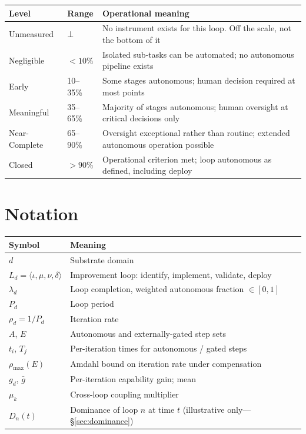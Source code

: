 \documentclass[11pt]{article}
\begin{document}
\begin{table}[h]
\centering
\footnotesize
\begin{tabular}{@{}llL{8.2cm}@{}}
\toprule
Level & Range & Operational meaning \\
\midrule
Unmeasured    & $\bot$     & No instrument exists for this loop. Off the scale, not the bottom of it \\
Negligible    & $<10\%$    & Isolated sub-tasks can be automated; no autonomous pipeline exists \\
Early         & 10--35\%   & Some stages autonomous; human decision required at most points \\
Meaningful    & 35--65\%   & Majority of stages autonomous; human oversight at critical decisions only \\
Near-Complete & 65--90\%   & Oversight exceptional rather than routine; extended autonomous operation possible \\
Closed        & $>90\%$    & Operational criterion met; loop autonomous as defined, including deploy \\
\bottomrule
\end{tabular}
\end{table}

\section{Notation}
\label{app:notation}

\begin{table}[h]
\centering
\footnotesize
\begin{tabular}{@{}lL{9.4cm}@{}}
\toprule
Symbol & Meaning \\
\midrule
$d$ & Substrate domain \\
$L_d = \langle\iota,\mu,\nu,\delta\rangle$ & Improvement loop: identify, implement, validate, deploy \\
$\lambda_d$ & Loop completion, weighted autonomous fraction $\in [0,1]$ \\
$P_d$ & Loop period \\
$\rho_d = 1/P_d$ & Iteration rate \\
$A$, $E$ & Autonomous and externally-gated step sets \\
$t_i$, $T_j$ & Per-iteration times for autonomous / gated steps \\
$\rho_{\max}(E)$ & Amdahl bound on iteration rate under compensation \\
$g_d$, $\bar{g}$ & Per-iteration capability gain; mean \\
$\mu_k$ & Cross-loop coupling multiplier \\
$D_n(t)$ & Dominance of loop $n$ at time $t$ (illustrative only---\S\ref{sec:dominance}) \\
\bottomrule
\end{tabular}
\end{table}



\end{document}

